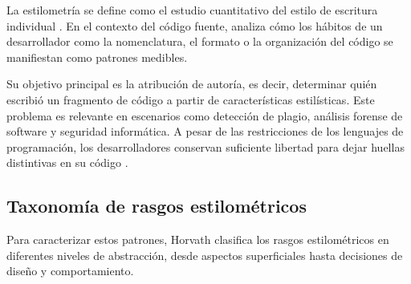 La estilometría se define como el estudio cuantitativo del estilo de escritura individual \cite{Horvath2026ProgrammerAttribution}. En el contexto del código fuente, analiza cómo los hábitos de un desarrollador como la nomenclatura, el formato o la organización del código se manifiestan como patrones medibles.

Su objetivo principal es la atribución de autoría, es decir, determinar quién escribió un fragmento de código a partir de características estilísticas. Este problema es relevante en escenarios como detección de plagio, análisis forense de software y seguridad informática. A pesar de las restricciones de los lenguajes de programación, los desarrolladores conservan suficiente libertad para dejar huellas distintivas en su código \cite{Horvath2026ProgrammerAttribution}.

\subsection{Taxonomía de rasgos estilométricos}

Para caracterizar estos patrones, Horvath \cite{Horvath2026ProgrammerAttribution} clasifica los rasgos estilométricos en diferentes niveles de abstracción, desde aspectos superficiales hasta decisiones de diseño y comportamiento.


